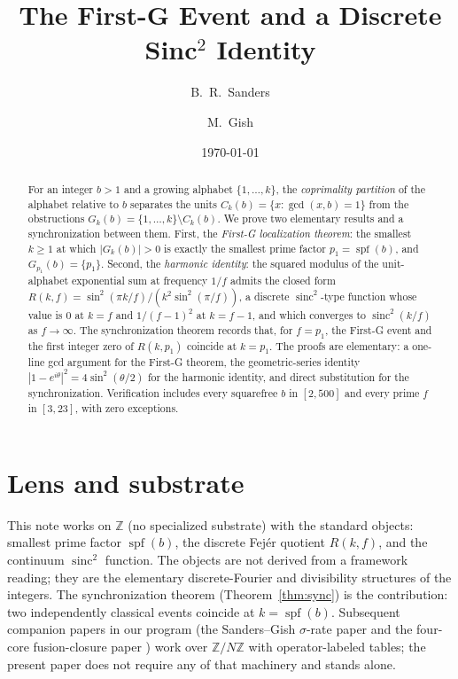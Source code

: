 \documentclass[11pt,reqno]{amsart}
\title[The First-G event and a discrete sinc${}^{2}$ identity]%
{The First-G Event and a Discrete Sinc${}^{2}$ Identity}
\author{B.~R.~Sanders}
\author{M.~Gish}
\date{\today}
\theoremstyle{plain}
\theoremstyle{definition}
\theoremstyle{remark}
\DeclareMathOperator{\spf}{spf}
\DeclareMathOperator{\sinc}{sinc}
\newcommand{\Z}{\mathbb{Z}}
\begin{document}
\begin{abstract}
For an integer $b > 1$ and a growing alphabet $\{1,\dots,k\}$, the
\emph{coprimality partition} of the alphabet relative to $b$ separates
the units $C_{k}(b) = \{x : \gcd(x,b) = 1\}$ from the obstructions
$G_{k}(b) = \{1,\dots,k\}\setminus C_{k}(b)$. We prove two elementary
results and a synchronization between them. First, the
\emph{First-G localization theorem}: the smallest $k\ge 1$ at which
$|G_{k}(b)|>0$ is exactly the smallest prime factor $p_{1}=\spf(b)$,
and $G_{p_{1}}(b) = \{p_{1}\}$. Second, the \emph{harmonic identity}:
the squared modulus of the unit-alphabet exponential sum at frequency
$1/f$ admits the closed form
$R(k,f) = \sin^{2}(\pi k/f)/(k^{2}\sin^{2}(\pi/f))$, a discrete
$\sinc^{2}$-type function whose value is $0$ at $k=f$ and $1/(f-1)^{2}$
at $k=f-1$, and which converges to $\sinc^{2}(k/f)$ as $f\to\infty$.
The synchronization theorem records that, for $f = p_{1}$, the First-G
event and the first integer zero of $R(k,p_{1})$ coincide at $k=p_{1}$.
The proofs are elementary: a one-line gcd argument for the
First-G theorem, the geometric-series identity
$|1-e^{i\theta}|^{2} = 4\sin^{2}(\theta/2)$ for the harmonic identity,
and direct substitution for the synchronization. Verification includes
every squarefree $b$ in $[2,500]$ and every prime $f$ in $[3,23]$,
with zero exceptions.
\end{abstract}

\maketitle

\section*{Lens and substrate}\label{sec:lens}

This note works on $\Z$ (no specialized substrate) with the standard
objects: smallest prime factor $\spf(b)$, the discrete Fej\'{e}r
quotient $R(k, f)$, and the continuum $\sinc^{2}$ function. The objects
are not derived from a framework reading; they are the elementary
discrete-Fourier and divisibility structures of the integers. The
synchronization theorem (Theorem~\ref{thm:sync}) is the contribution:
two independently classical events coincide at $k = \spf(b)$.
Subsequent companion papers in our program (the Sanders--Gish
$\sigma$-rate paper and the four-core fusion-closure paper
\cite{SandersGish2026Sigma,SandersGish2026FourCore}) work over
$\Z/N\Z$ with operator-labeled tables; the present paper does not
require any of that machinery and stands alone.
\end{document}
